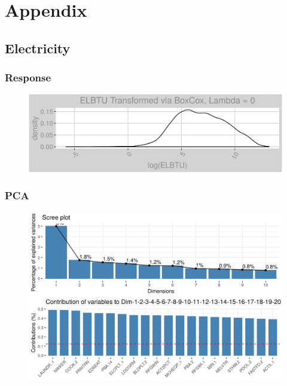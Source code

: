 \section*{Appendix}
\label{sec:appendix}
\appendix
\subsection{Electricity}
\subsubsection{Response}
\label{appendix:electricity:response}
\begin{figure}[h]
\centering
\includegraphics[width=\textwidth, height=0.3\textheight]{Images/electricity_response.png}
\end{figure}
\subsubsection{PCA}
\label{appendix:electricity:pca}
\begin{figure}[h]
\centering
\includegraphics[width=\textwidth, height=0.3\textheight]{Images/electricity_pca_vars.png}
\end{figure}
\FloatBarrier
\newpage
